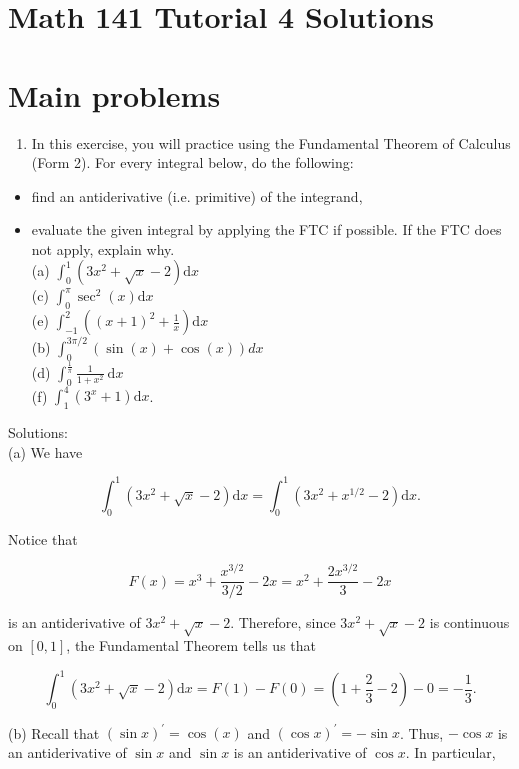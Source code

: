 \documentclass[10pt]{article}
\begin{document}
\section*{Math 141 Tutorial 4 Solutions}
\section*{Main problems}
\begin{enumerate}
  \item In this exercise, you will practice using the Fundamental Theorem of Calculus (Form 2). For every integral below, do the following:
\end{enumerate}

\begin{itemize}
  \item find an antiderivative (i.e. primitive) of the integrand,
  \item evaluate the given integral by applying the FTC if possible. If the FTC does not apply, explain why.\\
(a) $\int_{0}^{1}\left(3 x^{2}+\sqrt{x}-2\right) \mathrm{d} x$\\
(c) $\int_{0}^{\pi} \sec ^{2}(x) \mathrm{d} x$\\
(e) $\int_{-1}^{2}\left((x+1)^{2}+\frac{1}{x}\right) \mathrm{d} x$\\
(b) $\int_{0}^{3 \pi / 2}(\sin (x)+\cos (x)) d x$\\
(d) $\int_{0}^{\frac{1}{\pi}} \frac{1}{1+x^{2}} \mathrm{~d} x$\\
(f) $\int_{1}^{4}\left(3^{x}+1\right) \mathrm{d} x$.
\end{itemize}

Solutions:\\
(a) We have

$$
\int_{0}^{1}\left(3 x^{2}+\sqrt{x}-2\right) \mathrm{d} x=\int_{0}^{1}\left(3 x^{2}+x^{1 / 2}-2\right) \mathrm{d} x .
$$

Notice that

$$
F(x)=x^{3}+\frac{x^{3 / 2}}{3 / 2}-2 x=x^{2}+\frac{2 x^{3 / 2}}{3}-2 x
$$

is an antiderivative of $3 x^{2}+\sqrt{x}-2$. Therefore, since $3 x^{2}+\sqrt{x}-2$ is continuous on $[0,1]$, the Fundamental Theorem tells us that

$$
\int_{0}^{1}\left(3 x^{2}+\sqrt{x}-2\right) \mathrm{d} x=F(1)-F(0)=\left(1+\frac{2}{3}-2\right)-0=-\frac{1}{3} .
$$

(b) Recall that $(\sin x)^{\prime}=\cos (x)$ and $(\cos x)^{\prime}=-\sin x$. Thus, $-\cos x$ is an antiderivative of $\sin x$ and $\sin x$ is an antiderivative of $\cos x$. In particular,
\end{document}
